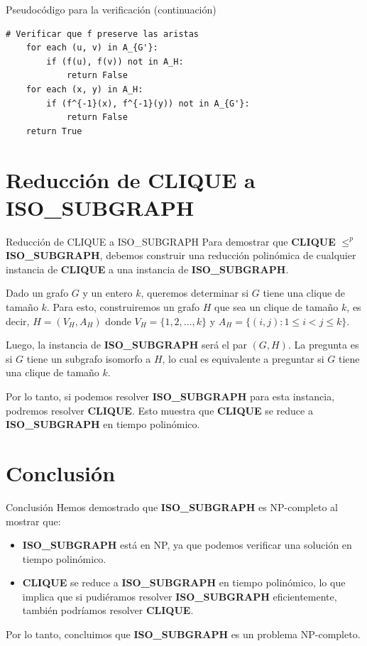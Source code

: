 \documentclass[aspectratio=169]{beamer}
\begin{document}
\begin{frame}[fragile]{Pseudocódigo para la verificación (continuación)}
    \begin{lstlisting}[basicstyle=\ttfamily\footnotesize]
    # Verificar que f preserve las aristas
    for each (u, v) in A_{G'}:
        if (f(u), f(v)) not in A_H:
            return False
    for each (x, y) in A_H:
        if (f^{-1}(x), f^{-1}(y)) not in A_{G'}:
            return False
    return True
    \end{lstlisting}
\end{frame}

\section{Reducción de CLIQUE a ISO\_SUBGRAPH}
\begin{frame}{Reducción de CLIQUE a ISO\_SUBGRAPH}
    Para demostrar que \textbf{CLIQUE} $\leq^p$ \textbf{ISO\_SUBGRAPH}, debemos construir una reducción polinómica de cualquier instancia de \textbf{CLIQUE} a una instancia de \textbf{ISO\_SUBGRAPH}.

    Dado un grafo $G$ y un entero $k$, queremos determinar si $G$ tiene una clique de tamaño $k$. Para esto, construiremos un grafo $H$ que sea un clique de tamaño $k$, es decir, $H = (V_H, A_H)$ donde $V_H = \{1, 2, \ldots, k\}$ y $A_H = \{(i, j) : 1 \leq i < j \leq k\}$.

    Luego, la instancia de \textbf{ISO\_SUBGRAPH} será el par $(G, H)$. La pregunta es si $G$ tiene un subgrafo isomorfo a $H$, lo cual es equivalente a preguntar si $G$ tiene una clique de tamaño $k$.

    Por lo tanto, si podemos resolver \textbf{ISO\_SUBGRAPH} para esta instancia, podremos resolver \textbf{CLIQUE}. Esto muestra que \textbf{CLIQUE} se reduce a \textbf{ISO\_SUBGRAPH} en tiempo polinómico.
\end{frame}

\section{Conclusión}
\begin{frame}{Conclusión}
    Hemos demostrado que \textbf{ISO\_SUBGRAPH} es NP-completo al mostrar que:

    \begin{itemize}
        \item \textbf{ISO\_SUBGRAPH} está en NP, ya que podemos verificar una solución en tiempo polinómico.
        \item \textbf{CLIQUE} se reduce a \textbf{ISO\_SUBGRAPH} en tiempo polinómico, lo que implica que si pudiéramos resolver \textbf{ISO\_SUBGRAPH} eficientemente, también podríamos resolver \textbf{CLIQUE}.
    \end{itemize}

    Por lo tanto, concluimos que \textbf{ISO\_SUBGRAPH} es un problema NP-completo.
\end{frame}
\end{document}
